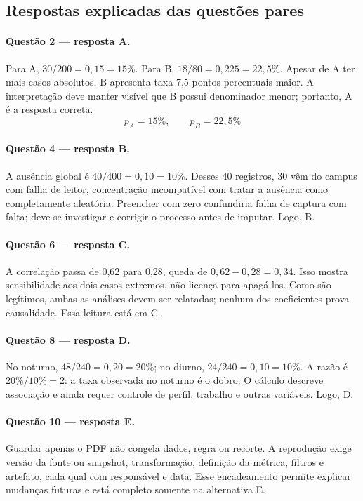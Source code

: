\subsection{Respostas explicadas das questões pares}

\paragraph{Questão 2 --- resposta A.} Para A, $30/200=0{,}15=15\%$. Para B, $18/80=0{,}225=22{,}5\%$. Apesar de A ter mais casos absolutos, B apresenta taxa 7,5 pontos percentuais maior. A interpretação deve manter visível que B possui denominador menor; portanto, A é a resposta correta.
\[p_A=15\%,\qquad p_B=22{,}5\%\]

\paragraph{Questão 4 --- resposta B.} A ausência global é $40/400=0{,}10=10\%$. Desses 40 registros, 30 vêm do campus com falha de leitor, concentração incompatível com tratar a ausência como completamente aleatória. Preencher com zero confundiria falha de captura com falta; deve-se investigar e corrigir o processo antes de imputar. Logo, B.

\paragraph{Questão 6 --- resposta C.} A correlação passa de 0,62 para 0,28, queda de $0{,}62-0{,}28=0{,}34$. Isso mostra sensibilidade aos dois casos extremos, não licença para apagá-los. Como são legítimos, ambas as análises devem ser relatadas; nenhum dos coeficientes prova causalidade. Essa leitura está em C.

\paragraph{Questão 8 --- resposta D.} No noturno, $48/240=0{,}20=20\%$; no diurno, $24/240=0{,}10=10\%$. A razão é $20\%/10\%=2$: a taxa observada no noturno é o dobro. O cálculo descreve associação e ainda requer controle de perfil, trabalho e outras variáveis. Logo, D.

\paragraph{Questão 10 --- resposta E.} Guardar apenas o PDF não congela dados, regra ou recorte. A reprodução exige versão da fonte ou snapshot, transformação, definição da métrica, filtros e artefato, cada qual com responsável e data. Esse encadeamento permite explicar mudanças futuras e está completo somente na alternativa E.

